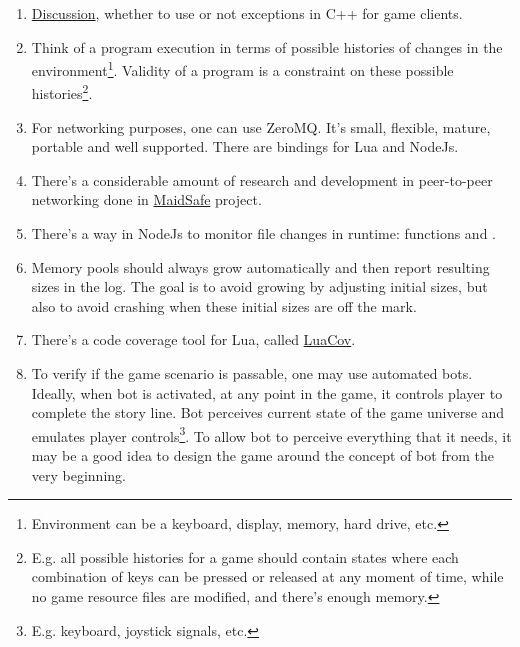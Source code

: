 \documentclass[12pt]{article}
\newcommand{\mylstinline}[2]{\fbox{\lstinline[language=#1]{#2}}}
\begin{document}
\begin{enumerate}
    \item
        \href{http://gamedev.stackexchange.com/questions/46424/try-catch-or-%
ifs-for-error-handling-in-c}%
        {Discussion}, whether to use or not exceptions in C++ for game clients.
    \item
        Think of a program execution in terms of possible histories of
        changes in the environment\footnote{
            Environment can be a keyboard, display, memory, hard drive, etc.
        }.
        Validity of a program is a constraint on these possible
        histories\footnote{
            E.g. all possible histories for a game should contain states where
            each combination of keys can be pressed or released at any moment
            of time, while no game resource files are modified, and
            there's enough memory.
        }.
    \item
        For networking purposes, one can use ZeroMQ.
        It's small, flexible, mature, portable and well supported.
        There are bindings for Lua and NodeJs.
    \item
        There's a considerable amount of research and development in
        peer-to-peer networking done in
        \href{http://maidsafe.net/}{MaidSafe} project.
    \item
        There's a way in NodeJs to monitor file changes in runtime:
        functions \mylstinline{bash}{fs.watch} and
        \mylstinline{bash}{fs.watchFile}.
    \item
        Memory pools should always grow automatically and then report
        resulting sizes in the log.
        The goal is to avoid growing by adjusting initial sizes, but also
        to avoid crashing when these initial sizes are off the mark.
    \item
        There's a code coverage tool for Lua, called
        \href{https://github.com/keplerproject/luacov}{LuaCov}.
    \item
        To verify if the game scenario is passable, one may use automated bots.
        Ideally, when bot is activated, at any point in the game,
        it controls player to complete the story line.
        Bot perceives current state of the game universe and emulates
        player controls\footnote{
            E.g. keyboard, joystick signals, etc.
        }.
        To allow bot to perceive everything that it needs, it may be a good
        idea to design the game around the concept of bot from the very
        beginning.
        
\end{enumerate}
\end{document}
